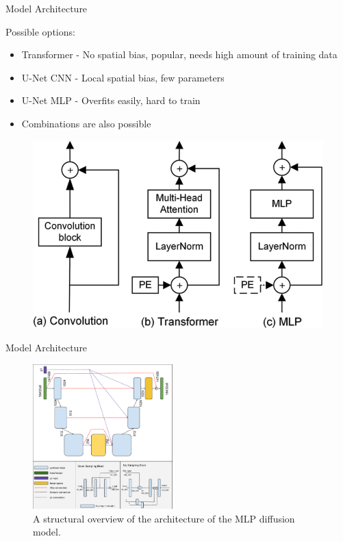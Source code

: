 \documentclass[compress, aspectratio=169]{beamer}
\begin{document}
\begin{frame}{Model Architecture}
\begin{multicols}{2}  
Possible options:
    \begin{itemize}
        \item Transformer - No spatial bias, popular, needs high amount of training data
        \item U-Net CNN - Local spatial bias, few parameters
        \item U-Net MLP - Overfits easily, hard to train
        \item Combinations are also possible
    \end{itemize}
\columnbreak

\begin{figure}
    \centering
    \includegraphics[width=1.0\linewidth]{figures/architecture.png}
\end{figure}
\end{multicols}

\end{frame}

\begin{frame}{Model Architecture}
\begin{figure}
    \centering
     \includegraphics[width = 0.48\textwidth]{figures/Kenneweg.141.fig.2.pdf}
    \caption{A structural overview of the architecture of the MLP diffusion model.}
    \label{fig:unet}
\end{figure}
\end{frame}
\end{document}
